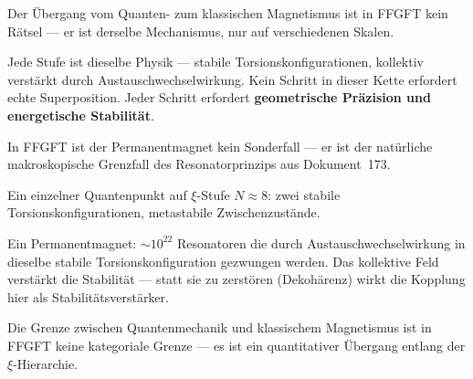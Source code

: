 Der Übergang vom Quanten- zum klassischen Magnetismus
ist in FFGFT kein Rätsel --- er ist derselbe Mechanismus,
nur auf verschiedenen Skalen.

\begin{center}
\end{center}

Jede Stufe ist dieselbe Physik --- stabile Torsionskonfigurationen,
kollektiv verstärkt durch Austauschwechselwirkung.
Kein Schritt in dieser Kette erfordert echte Superposition.
Jeder Schritt erfordert \textbf{geometrische Präzision und
energetische Stabilität}.

\begin{foundation}
In FFGFT ist der Permanentmagnet kein Sonderfall ---
er ist der natürliche makroskopische Grenzfall
des Resonatorprinzips aus Dokument~173.

Ein einzelner Quantenpunkt auf $\xi$-Stufe $N \approx 8$:
zwei stabile Torsionskonfigurationen, metastabile Zwischenzustände.

Ein Permanentmagnet:
$\sim 10^{22}$ Resonatoren die durch Austauschwechselwirkung
in dieselbe stabile Torsionskonfiguration gezwungen werden.
Das kollektive Feld verstärkt die Stabilität --- statt sie zu
zerstören (Dekohärenz) wirkt die Kopplung hier als
Stabilitätsverstärker.

Die Grenze zwischen Quantenmechanik und klassischem Magnetismus
ist in FFGFT keine kategoriale Grenze ---
es ist ein quantitativer Übergang entlang der $\xi$-Hierarchie.
\end{foundation}


